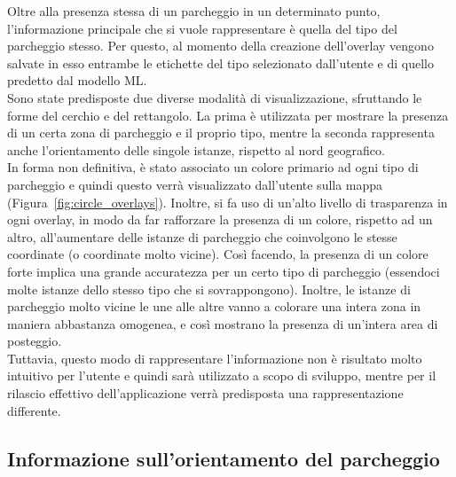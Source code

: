 Oltre alla presenza stessa di un parcheggio in un determinato punto, l'informazione
principale che si vuole rappresentare è quella del tipo del parcheggio stesso.
Per questo, al momento della creazione dell'overlay vengono salvate in esso 
entrambe le etichette del tipo selezionato dall'utente e di quello predetto
dal modello ML.\\
Sono state predisposte due diverse modalità di visualizzazione, sfruttando le 
forme del cerchio e del rettangolo. La prima è utilizzata per mostrare la 
presenza di un certa zona di parcheggio e il proprio tipo, mentre la seconda
rappresenta anche l'orientamento delle singole istanze, rispetto al nord geografico.\\
In forma non definitiva, è stato associato un colore primario ad ogni tipo di 
parcheggio e quindi questo verrà visualizzato dall'utente sulla mappa 
(Figura~\ref{fig:circle_overlays}). Inoltre,
si fa uso di un'alto livello di trasparenza in ogni overlay, in modo da far 
rafforzare la presenza di un colore, rispetto ad un altro, all'aumentare delle
istanze di parcheggio che coinvolgono le stesse coordinate (o coordinate molto
vicine). Così facendo, la presenza di un colore forte implica una grande 
accuratezza per un certo tipo di parcheggio (essendoci molte istanze dello stesso
tipo che si sovrappongono). Inoltre, le istanze di parcheggio molto vicine le une alle
altre vanno a colorare una intera zona in maniera abbastanza omogenea, e così mostrano
la presenza di un'intera area di posteggio.\\
Tuttavia, questo modo di rappresentare 
l'informazione non è risultato molto intuitivo per l'utente e quindi sarà utilizzato 
a scopo di sviluppo, mentre per il rilascio effettivo dell'applicazione verrà predisposta
una rappresentazione differente.

\subsection{Informazione sull'orientamento del parcheggio} 

